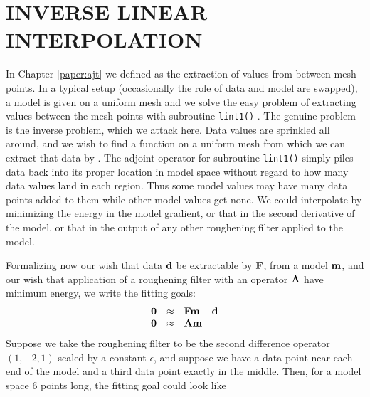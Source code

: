\section{INVERSE LINEAR INTERPOLATION}
In Chapter \ref{paper:ajt} we defined 
as the extraction of values from between mesh points.
In a typical setup (occasionally the role of data and model are swapped),
a model is given on a uniform mesh
and we solve the easy problem of extracting values
between the mesh points with subroutine \texttt{lint1()} .
The genuine problem is the inverse problem, which we attack here.
Data values are sprinkled all around,
and we wish to find a function on a uniform mesh
from which we can extract that data by .
The adjoint operator for subroutine {\tt lint1()}
simply piles data back into its proper location in model space
without regard to how many data values land in each region.
Thus some model values may have many data points added
to them while other model values get none.
We could interpolate by minimizing the energy in the model gradient,
or that in the second derivative of the model,
or that in the output of any other roughening filter
applied to the model.
\par
Formalizing now our wish
that data $\bold d$ be extractable by  $\bold F$,
from a model $\bold m$,
and our wish that application of a roughening filter
with an operator $\bold A$ have minimum energy, we write the fitting goals:
\begin{equation}
        \begin{array}{lll}
        \bold 0 &\approx & \bold F \bold m - \bold d \\
        \bold 0 &\approx & \bold A \bold m
        \label{eqn:invintwish}
        \end{array}
\end{equation}
Suppose we take the roughening filter to be the second difference operator
$(1,-2,1)$
scaled by a constant $\epsilon$,
and suppose we have a data point near each end of the model
and a third data point exactly in the middle.
Then,
for a model space 6 points long,
the fitting goal could look like
\def\E{\epsilon}
